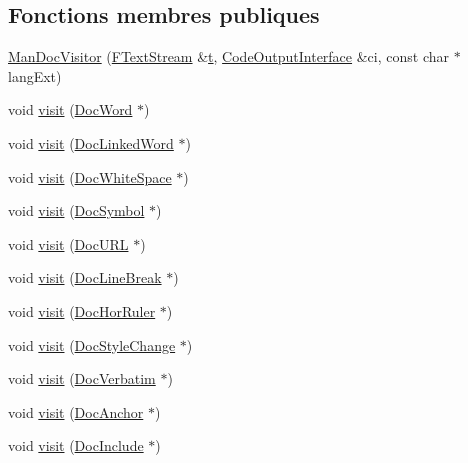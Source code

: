 \subsection*{Fonctions membres publiques}
\begin{DoxyCompactItemize}
\item 
\hyperlink{class_man_doc_visitor_a2cde7798dbf5b935ea19a24143592691}{Man\+Doc\+Visitor} (\hyperlink{class_f_text_stream}{F\+Text\+Stream} \&\hyperlink{058__bracket__recursion_8tcl_a69e959f6901827e4d8271aeaa5fba0fc}{t}, \hyperlink{class_code_output_interface}{Code\+Output\+Interface} \&ci, const char $\ast$lang\+Ext)
\item 
void \hyperlink{class_man_doc_visitor_a78d86f216cde7db35913c83f439aee47}{visit} (\hyperlink{class_doc_word}{Doc\+Word} $\ast$)
\item 
void \hyperlink{class_man_doc_visitor_a976144c66fb2b63504ea913910a7a7f0}{visit} (\hyperlink{class_doc_linked_word}{Doc\+Linked\+Word} $\ast$)
\item 
void \hyperlink{class_man_doc_visitor_ac3fa7a7d15c49edbb330fb204672c4ca}{visit} (\hyperlink{class_doc_white_space}{Doc\+White\+Space} $\ast$)
\item 
void \hyperlink{class_man_doc_visitor_a3e5b70fdc47f9a0f7853309dc81f5a2f}{visit} (\hyperlink{class_doc_symbol}{Doc\+Symbol} $\ast$)
\item 
void \hyperlink{class_man_doc_visitor_a9a7b6956a8ac6c89ee141368991c1819}{visit} (\hyperlink{class_doc_u_r_l}{Doc\+U\+R\+L} $\ast$)
\item 
void \hyperlink{class_man_doc_visitor_ad381c88ef578c667010b0371dcdf63f2}{visit} (\hyperlink{class_doc_line_break}{Doc\+Line\+Break} $\ast$)
\item 
void \hyperlink{class_man_doc_visitor_a8ac3645c640850908b9e959c81f9af8a}{visit} (\hyperlink{class_doc_hor_ruler}{Doc\+Hor\+Ruler} $\ast$)
\item 
void \hyperlink{class_man_doc_visitor_ab5d2dd27fa5eef611a68e9c64edde672}{visit} (\hyperlink{class_doc_style_change}{Doc\+Style\+Change} $\ast$)
\item 
void \hyperlink{class_man_doc_visitor_afce754a7c4c92143bb07a9f3334dbc86}{visit} (\hyperlink{class_doc_verbatim}{Doc\+Verbatim} $\ast$)
\item 
void \hyperlink{class_man_doc_visitor_a3fb42461ac61b66285d0666eed9d23b3}{visit} (\hyperlink{class_doc_anchor}{Doc\+Anchor} $\ast$)
\item 
void \hyperlink{class_man_doc_visitor_a9e6cd979f65b491fa8b29226b219f114}{visit} (\hyperlink{class_doc_include}{Doc\+Include} $\ast$)

\end{DoxyCompactItemize}
